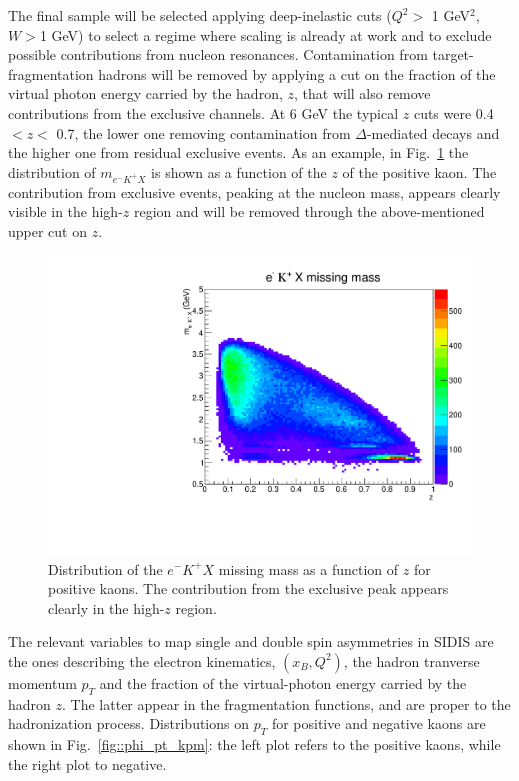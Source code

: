 The final sample will be selected applying deep-inelastic cuts ($Q^2>$ 1 GeV$^2$, $W>$1 GeV) to select a regime where scaling is already at work and to exclude possible contributions from nucleon resonances. 
Contamination from target-fragmentation hadrons will be removed by applying a cut on the fraction of the virtual photon energy carried by the hadron, $z$, that will also remove contributions from the exclusive channels. At 6 GeV the typical $z$ cuts were 0.4 $<z<$ 0.7, the lower one removing contamination from $\Delta$-mediated decays and the higher one from residual exclusive events. 
As an example, in Fig.~\ref{fig::mx} the distribution of $m_{e^-K^+X}$ is shown as a function of the $z$ of the positive kaon. The contribution from exclusive events, peaking at the nucleon mass, appears clearly visible in the high-$z$ region and will be removed through the above-mentioned upper cut on $z$.\\
%
%
%
\begin{figure}
\centering
\includegraphics[width=1.0\textwidth]{sidis/mmElKappaPX.pdf}
\caption{\label{fig::mx} Distribution of the $e^-K^+X$ missing mass as a function of $z$ for positive kaons. The contribution from the exclusive peak appears clearly in the high-$z$ region.}
\end{figure}
%
%
The relevant variables to map single and double spin asymmetries in SIDIS are the ones describing the electron kinematics, $(x_B, Q^2)$, the hadron tranverse momentum $p_T$ and the fraction of the virtual-photon energy carried by the hadron $z$. The latter appear in the fragmentation functions, and are proper to the hadronization process. 
Distributions on $p_T$ for positive and negative kaons are shown in Fig.~\ref{fig::phi_pt_kpm}: the left plot refers to the positive kaons, while the right plot to negative. 
